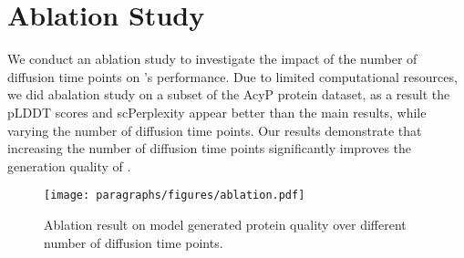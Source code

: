 \section{Ablation Study}
\label{sec:ablation}
We conduct an ablation study to investigate the impact of the number of diffusion time points on \method{}'s performance. Due to limited computational resources, we did abalation study on a subset of the AcyP protein dataset, as a result the pLDDT scores and scPerplexity appear better than the main results, while varying the number of diffusion time points. Our results demonstrate that increasing the number of diffusion time points significantly improves the generation quality of \method{}.
\begin{figure}[t]
    \centering
    \texttt{[image: paragraphs/figures/ablation.pdf]}
    \label{fig:ablation_timepoint}
    \caption{Ablation result on model generated protein quality over different number of diffusion time points.}
\end{figure}